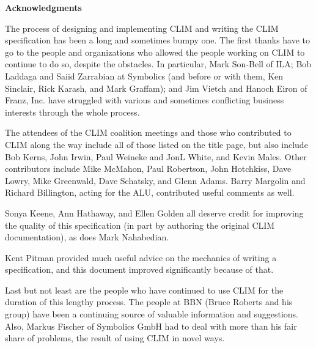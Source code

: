 
\vspace*{50pt}
{\huge\bf Acknowledgments}\par
\vskip 40pt

The process of designing and implementing CLIM and writing the CLIM
specification has been a long and sometimes bumpy one.  The first thanks have
to go to the people and organizations who allowed the people working on CLIM
to continue to do so, despite the obstacles.  In particular, Mark Son-Bell of
ILA; Bob Laddaga and Saiid Zarrabian at Symbolics (and before or with them,
Ken Sinclair, Rick Karash, and Mark Graffam); and Jim Vietch and Hanoch Eiron
of Franz, Inc.  have struggled with various and sometimes conflicting business
interests through the whole process.

The attendees of the CLIM coalition meetings and those who contributed to CLIM
along the way include all of those listed on the title page, but also include
Bob Kerns, John Irwin, Paul Weineke and JonL White, and Kevin Males.  Other
contributors include Mike McMahon, Paul Robertson, John Hotchkiss, Dave Lowry,
Mike Greenwald, Dave Schatsky, and Glenn Adams.  Barry Margolin and Richard
Billington, acting for the ALU, contributed useful comments as well.

Sonya Keene, Ann Hathaway, and Ellen Golden all deserve credit for improving
the quality of this specification (in part by authoring the original CLIM
documentation), as does Mark Nahabedian.

Kent Pitman provided much useful advice on the mechanics of writing a
specification, and this document improved significantly because of that.

Last but not least are the people who have continued to use CLIM for the
duration of this lengthy process.  The people at BBN (Bruce Roberts and his
group) have been a continuing source of valuable information and suggestions.
Also, Markus Fischer of Symbolics GmbH had to deal with more than his fair
share of problems, the result of using CLIM in novel ways.
